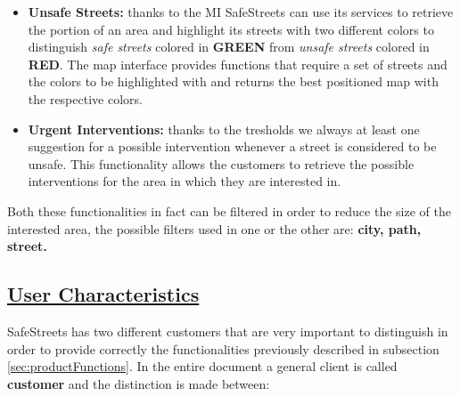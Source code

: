 		 \begin{itemize}
		 	\item \textbf{Unsafe Streets:} thanks to the MI SafeStreets can use its services to retrieve the portion of an area and highlight its streets with two different colors to distinguish \emph{safe streets} colored in \textbf{GREEN} from \emph{unsafe streets} colored in \textbf{RED}. The map interface provides functions that require a set of streets and the colors to be highlighted with and returns the best positioned map with the respective colors. 
		 	
		 	\item \textbf{Urgent Interventions:} thanks to the tresholds we always at least one suggestion for a possible intervention whenever a street is considered to be unsafe. This functionality allows the customers to retrieve the possible interventions for the area in which they are interested in.
		 \end{itemize}
	 
	 	Both these functionalities in fact can be filtered in order to reduce the size of the interested area, the possible filters used in one or the other are: \textbf{city, path, street.}
		
\subsection[User Characteristics]{\hyperlink{toc}{User Characteristics}}
	\label{sec:userCharacteristics}
	SafeStreets has two different customers that are very important to distinguish in order to provide correctly the functionalities previously described in subsection \ref{sec:productFunctions}. In the entire document a general client is called \textbf{customer} and the distinction is made between:
	
